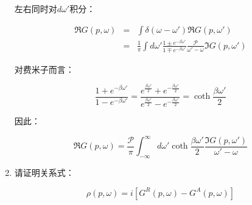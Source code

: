 \begin{enumerate}
左右同时对$d \omega'$积分：

\begin{eqnarray*}
\Re G(p, \omega) &=& \int \delta (\omega - \omega' ) \Re G (p, \omega' ) \\
{}&=& \frac{1}{\pi} \int d \omega' \frac{1 \pm e^{-\beta \omega'}}{ 1 \mp e^{-\beta \omega'} } \frac{\mathcal{P}}{ \omega' - \omega} \Im G(p, \omega')
\end{eqnarray*}

对费米子而言：

\begin{equation*}
\frac{1+e^{-\beta \omega'}}{1- e^{-\beta \omega'} } = \frac{e^{\frac{\beta \omega'}{2}} + e^{-\frac{\beta \omega'}{2}}  }{ e^{\frac{\beta \omega'}{2}} - e^{-\frac{\beta \omega'}{2}}  } = \coth \frac{\beta \omega' }{2}
\end{equation*}

因此：

\begin{equation*}
\Re G (p, \omega) = \frac{\mathcal{P} }{\pi} \int_{- \infty}^{ \infty} d \omega' \coth \frac{\beta \omega'}{2} \frac{\Im G (p, \omega' )}{\omega' - \omega}
\end{equation*}

\item

请证明关系式：

\begin{equation*}
\rho(p, \omega) = i \left[ G^R (p, \omega) - G^A (p, \omega)  \right]
\end{equation*}

\end{enumerate}


